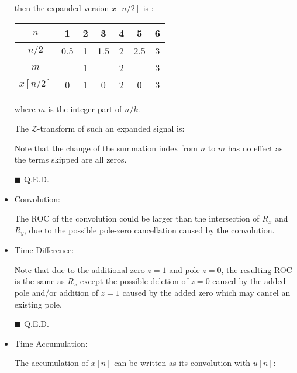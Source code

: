 \begin{itemize}
\begin{tcolorbox}[colframe=black,colback=white,sharp corners]
		then the expanded version $x[n/2]$ is :
		\begin{table}[H]
		\centering
		\begin{tabular}{c|cccccc} \hline
		 $n$ & 1 & 2 & 3 & 4 & 5 & 6 \\ \hline
		 $n/2$ & 0.5 & 1 & 1.5 & 2 & 2.5 & 3 \\ \hline
		 $m$ &	     & 1 &     & 2 &     & 3 \\ \hline
		 $x[n/2]$ & 0 & 1 & 0 & 2 & 0 & 3 \\ \hline 
		\end{tabular}
		\end{table}
		
		where $m$ is the integer part of $n/k$.
		\end{tcolorbox} 
		
		\begin{dem}
		 The $\mathcal{Z}$-transform of such an expanded signal is:
		
		Note that the change of the summation index from $n$ to $m$ has no effect as the terms skipped are all zeros.
		\begin{flushright}
			$\blacksquare$  Q.E.D.
		\end{flushright}
		\end{dem}
		
		\item Convolution:
		
		The ROC of the convolution could be larger than the intersection of $R_x$ and $R_y$, due to the possible pole-zero cancellation caused by the convolution.
		
		\item Time Difference:
		
		\begin{dem}
		
		Note that due to the additional zero $z=1$ and pole $z=0$, the resulting ROC is the same as $R_x$ except the possible deletion of $z=0$ caused by the added pole and/or addition of $z=1$ caused by the added zero which may cancel an existing pole.
		\begin{flushright}
			$\blacksquare$  Q.E.D.
		\end{flushright}
		\end{dem}
		
		\item Time Accumulation:
			
		\begin{dem}
		The accumulation of $x[n]$ can be written as its convolution with $u[n]$:
		

\end{dem}
\end{itemize}
